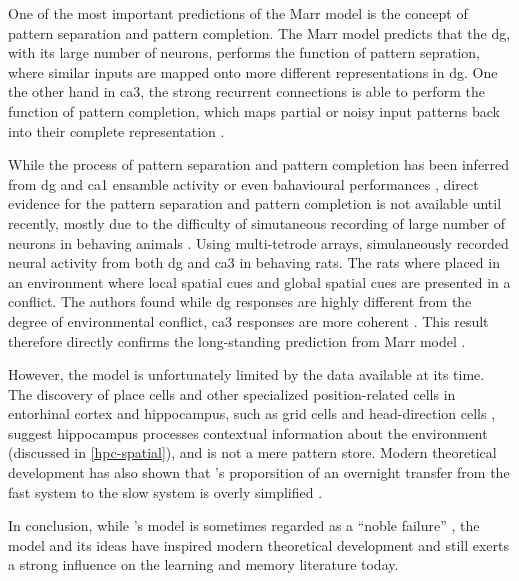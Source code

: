 One of the most important predictions of the Marr model \citep{marr71} is the concept of pattern separation and pattern completion. The Marr model predicts that the \gls{dg}, with its large number of neurons, performs the function of pattern sepration, where similar inputs are mapped onto more different representations in \gls{dg}. One the other hand in \gls{ca3}, the strong recurrent connections is able to perform the function of pattern completion, which maps partial or noisy input patterns back into their complete representation \citep{rolls13, knierim16}. 

While the process of pattern separation and pattern completion has been inferred from \gls{dg} and \gls{ca1} ensamble activity or even bahavioural performances \citep{santoro13, rolls13}, direct evidence for the pattern separation and pattern completion is not available until recently, mostly due to the difficulty of simutaneous recording of large number of neurons in behaving animals \citep{knierim16}. Using multi-tetrode arrays, \citet{neunuebel14} simulaneously recorded neural activity from both \gls{dg} and \gls{ca3} in behaving rats. The rats where placed in an environment where local spatial cues and global spatial cues are presented in a conflict. The authors found while \gls{dg} responses are highly different from the degree of environmental conflict, \gls{ca3} responses are more coherent \citep{neunuebel14}. This result therefore directly confirms the long-standing prediction from Marr model \cite{rolls13, knierim16}. 

However, the \citet{marr71} model is unfortunately limited by the data available at its time. The discovery of place cells \citep{o'keefe71} and other specialized position-related cells in entorhinal cortex and hippocampus, such as grid cells and head-direction cells \citep{taube90, fyhn04, hafting05}, suggest hippocampus processes contextual information about the environment (discussed in \ref{hpc-spatial}), and is not a mere pattern store. Modern theoretical development has also shown that \citet{marr71}'s proporsition of an overnight transfer from the fast system to the slow system is overly simplified \citep{squire09}. 

In conclusion, while \citet{marr71}'s model is sometimes regarded as a ``noble failure'' \citep{willshaw15}, the model and its ideas have inspired modern theoretical development and still exerts a strong influence on the learning and memory literature today. 


